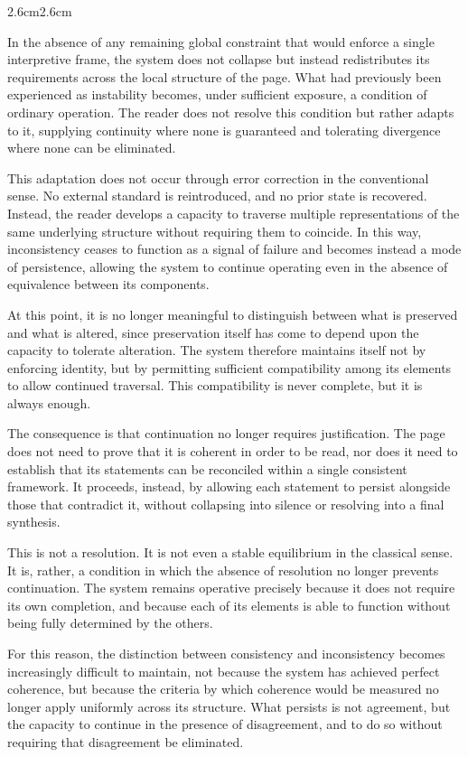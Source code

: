 \begin{adjustwidth}{2.6cm}{2.6cm}

In the absence of any remaining global constraint that would enforce a single
interpretive frame, the system does not collapse but instead redistributes its
requirements across the local structure of the page. What had previously been
experienced as instability becomes, under sufficient exposure, a condition of
ordinary operation. The reader does not resolve this condition but rather adapts
to it, supplying continuity where none is guaranteed and tolerating divergence
where none can be eliminated.

This adaptation does not occur through error correction in the conventional
sense. No external standard is reintroduced, and no prior state is recovered.
Instead, the reader develops a capacity to traverse multiple representations of
the same underlying structure without requiring them to coincide. In this way,
inconsistency ceases to function as a signal of failure and becomes instead a
mode of persistence, allowing the system to continue operating even in the
absence of equivalence between its components.

At this point, it is no longer meaningful to distinguish between what is
preserved and what is altered, since preservation itself has come to depend upon
the capacity to tolerate alteration. The system therefore maintains itself not
by enforcing identity, but by permitting sufficient compatibility among its
elements to allow continued traversal. This compatibility is never complete, but
it is always enough.

The consequence is that continuation no longer requires justification. The page
does not need to prove that it is coherent in order to be read, nor does it need
to establish that its statements can be reconciled within a single consistent
framework. It proceeds, instead, by allowing each statement to persist alongside
those that contradict it, without collapsing into silence or resolving into a
final synthesis.

This is not a resolution. It is not even a stable equilibrium in the classical
sense. It is, rather, a condition in which the absence of resolution no longer
prevents continuation. The system remains operative precisely because it does
not require its own completion, and because each of its elements is able to
function without being fully determined by the others.

For this reason, the distinction between consistency and inconsistency becomes
increasingly difficult to maintain, not because the system has achieved perfect
coherence, but because the criteria by which coherence would be measured no
longer apply uniformly across its structure. What persists is not agreement, but
the capacity to continue in the presence of disagreement, and to do so without
requiring that disagreement be eliminated.


\end{adjustwidth}
